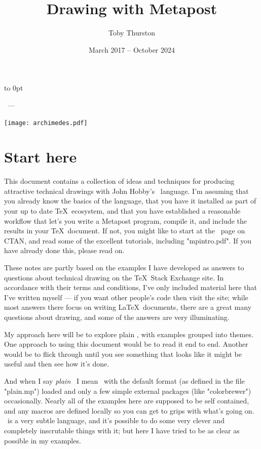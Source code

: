 \documentclass[a4paper,landscape]{article}
\title{Drawing with Metapost}
\author{Toby Thurston}
\date{March 2017 – October 2024}
\begin{document}
\let\folio\thepage
\renewcommand{\thepage}{\rlap{\hbox to 5in{\hss\small\folio}}}
\pagestyle{myheadings}
\raggedbottom
\makeatletter
\moveright 6in\vbox to
0pt{\vskip23pt\noindent\sffamily{\Large\bfseries\@title}\par\bigskip
    \noindent\@author\ --- \@date\par
    \bigskip\noindent
    \texttt{[image: archimedes.pdf]}
\vss}
\makeatother
\thispagestyle{empty}
\section{Start here}

This document contains a collection of ideas and techniques for producing attractive
technical drawings with John Hobby’s \MP\ language.  I’m assuming that you already
know the basics of the language, that you have it installed as part of your up to
date \TeX\ ecosystem, and that you have established a reasonable workflow that
let’s you write a Metapost program, compile it, and include the results in your
\TeX\ document.  If not, you might like to start at the \MP\ page on CTAN, and read
some of the excellent tutorials, including "mpintro.pdf".  If you have already done
this, please read on.

These notes are partly based on the examples I have developed as answers
to questions about technical drawing on the \TeX\ Stack Exchange site.  In
accordance with their terms and conditions, I’ve only included material here that
I’ve written myself --- if you want other people’s code then visit the site;
while most answers there focus on writing \LaTeX\ documents, there are a great
many questions about drawing, and some of the answers are very illuminating.

My approach here will be to explore plain \MP, with examples grouped
into themes.  One approach to using this document would be to read it end to end.
Another would be to flick through until you see something that looks like it might
be useful and then see how it’s done.

And when I say \textit{plain} \MP\ I mean \MP\ with the default format (as defined
in the file "plain.mp") loaded and only a few simple external packages (like
"colorbrewer") occasionally.  Nearly all of the examples here are supposed to be self
contained, and any macros are defined locally so you can get to grips with what’s
going on.  \MP\ is a very subtle language, and it’s possible to do some very clever
and completely inscrutable things with it;  but here I have tried to be as clear as
possible in my examples.
\end{document}
